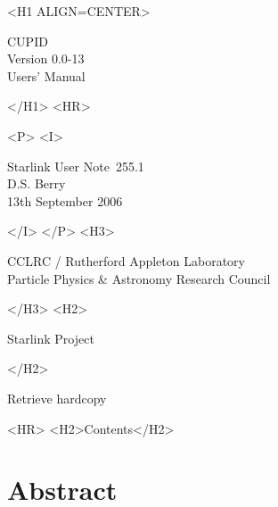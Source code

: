 \documentclass[twoside,11pt]{article}
\newcommand{\stardoccategory}  {Starlink User Note}
\newcommand{\stardocsource}    {sun\stardocnumber}
\newcommand{\stardocnumber}    {255.1}
\newcommand{\stardocauthors}   {D.S. Berry}
\newcommand{\stardocdate}      {13th September 2006}
\newcommand{\stardoctitle}     {CUPID}
\newcommand{\stardocversion}   {Version 0.0-13}
\newcommand{\stardocmanual}    {Users' Manual}
\newcommand{\htmladdnormallink}[2]{#1}
\newcommand{\htmladdimg}[1]{}
\newcommand{\htmlref}[2]{#1}
\newcommand{\htmladdtonavigation}[1]{}
\newcommand{\xlabel}[1]{}
\renewcommand{\_}{\texttt{\symbol{95}}}
\begin{document}
\begin{htmlonly}
   \xlabel{}
   \begin{rawhtml} <H1 ALIGN=CENTER> \end{rawhtml}
      \stardoctitle\\
      \stardocversion\\
      \stardocmanual
   \begin{rawhtml} </H1> <HR> \end{rawhtml}

   \begin{rawhtml} <P> <I> \end{rawhtml}
   \stardoccategory\ \stardocnumber \\
   \stardocauthors \\
   \stardocdate
   \begin{rawhtml} </I> </P> <H3> \end{rawhtml}
      \htmladdnormallink{CCLRC}{http://www.cclrc.ac.uk} /
      \htmladdnormallink{Rutherford Appleton Laboratory}
                        {http://www.cclrc.ac.uk/ral} \\
      \htmladdnormallink{Particle Physics \& Astronomy Research Council}
                        {http://www.pparc.ac.uk} \\
   \begin{rawhtml} </H3> <H2> \end{rawhtml}
      \htmladdnormallink{Starlink Project}{http://www.starlink.rl.ac.uk/}
   \begin{rawhtml} </H2> \end{rawhtml}
   \htmladdnormallink{\htmladdimg{source.gif} Retrieve hardcopy}
      {http://www.starlink.rl.ac.uk/cgi-bin/hcserver?\stardocsource}\\

  \label{stardoccontents}
  \begin{rawhtml} 
    <HR>
    <H2>Contents</H2>
  \end{rawhtml}
  \htmladdtonavigation{\htmlref{\htmladdimg{contents_motif.gif}}
        {stardoccontents}}

  \section{\xlabel{abstract}Abstract}
\end{htmlonly}
\end{document}
